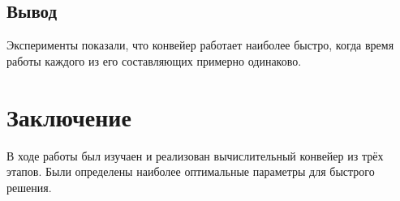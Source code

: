 \documentclass[12pt]{report}
\begin{document}
        \newpage    
 

\section{Вывод}

Эксперименты показали, что конвейер работает наиболее быстро, когда время работы каждого из его составляющих примерно одинаково. 


\chapter*{Заключение}
В ходе работы был изучаен и реализован вычислительный конвейер из трёх этапов. Были определены наиболее оптимальные параметры для быстрого решения.
\end{document}
